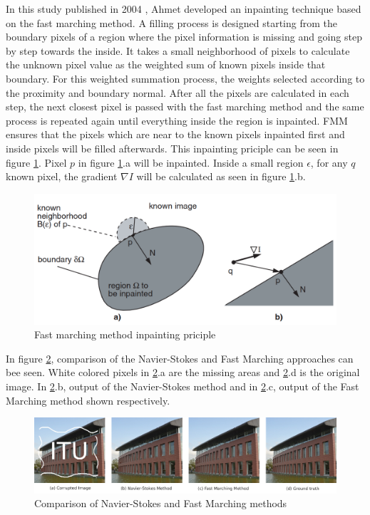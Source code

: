 In this study published in 2004 \cite{telea}, Ahmet developed an inpainting technique based on the fast marching method. A filling process is designed starting from the boundary pixels of a region where the pixel information is missing and going step by step towards the inside. It takes a small neighborhood of pixels to calculate the unknown pixel value as the weighted sum of known pixels inside that boundary. For this weighted summation process, the weights selected according to the proximity and boundary normal. After all the pixels are calculated in each step, the next closest pixel is passed with the fast marching method and the same process is repeated again until everything inside the region is inpainted. FMM ensures that the pixels which are near to the known pixels inpainted first and inside pixels will be filled afterwards. This inpainting priciple can be seen in figure \ref{fig:ffm}. Pixel \(p\) in figure \ref{fig:ffm}.a will be inpainted. Inside a small region \(\epsilon\), for any \(q\) known pixel, the gradient \(\nabla I\) will be calculated as seen in figure \ref{fig:ffm}.b.  

\begin{figure}[h]
    \centering
    \includegraphics[width=14cm]{figures/chapter2/ffm.png}
    \vspace*{4mm}
    \caption{Fast marching method inpainting priciple}
    \label{fig:ffm}
\end{figure}

In figure \ref{fig:traditional_comparison}, comparison of the Navier-Stokes and Fast Marching approaches can bee seen. White colored pixels in \ref{fig:traditional_comparison}.a are the missing areas and \ref{fig:traditional_comparison}.d is the original image. In \ref{fig:traditional_comparison}.b, output of the Navier-Stokes method and in \ref{fig:traditional_comparison}.c, output of the Fast Marching method shown respectively.

\begin{figure}[h]
    \centering
    \includegraphics[width=14cm]{figures/chapter2/traditional_comparison.png}
    \caption{Comparison of Navier-Stokes and Fast Marching methods}
    \label{fig:traditional_comparison}
\end{figure}
